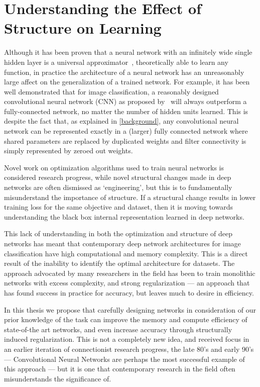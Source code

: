 \documentclass[thesis]{subfiles}
\begin{document}
\section{Understanding the Effect of Structure on Learning}
Although it has been proven that a neural network with an infinitely wide single hidden layer is a universal approximator~\citep{journals/mcss/Cybenko92,hornik89a},  theoretically able to learn any function, in practice the architecture of a neural network has an unreasonably large affect on the generalization of a trained network. For example, it has been well demonstrated that for image classification, a reasonably designed convolutional neural network (CNN) as proposed by~\citet{Lecun1998} will always outperform a fully-connected network, no matter the number of hidden units learned. This is despite the fact that, as explained in \cref{background}, any convolutional neural network can be represented exactly in a (larger) fully connected network where shared parameters are replaced by duplicated weights and filter connectivity is simply represented by zeroed out weights.

Novel work on optimization algorithms used to train neural networks is considered research progress, while novel structural changes made in deep networks are often dismissed as `engineering', but this is to fundamentally misunderstand the importance of structure. If a structural change results in lower training loss for the same objective and dataset, then it is moving towards understanding the black box internal representation learned in deep networks. %

This lack of understanding in both the optimization and structure of deep networks has meant that contemporary deep network architectures for image classification have high computational and memory complexity. This is a direct result of the inability to identify the optimal architecture for datasets. The approach advocated by many researchers in the field has been to train monolithic networks with excess complexity, and strong regularization --- an approach that has found success in practice for accuracy, but leaves much to desire in efficiency.

In this thesis we propose that carefully designing networks in consideration of our prior knowledge of the task can improve the memory and compute efficiency of state-of-the art networks, and even increase accuracy through structurally induced regularization. This is not a completely new idea, and received focus in an earlier iteration of connectionist research progress, the late 80's and early 90's --- Convolutional Neural Networks are perhaps the most successful example of this approach --- but it is one that contemporary research in the field often misunderstands the significance of.
\end{document}
